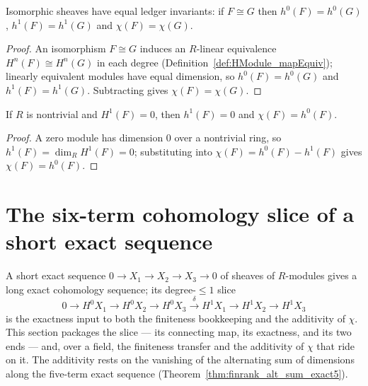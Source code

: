 \begin{theorem}
  \label{thm:chi_congr}
  \leanok
  Isomorphic sheaves have equal ledger invariants: if \(F \cong G\) then
  \(h^0(F) = h^0(G)\), \(h^1(F) = h^1(G)\) and \(\chi(F) = \chi(G)\).
\end{theorem}
\begin{proof}
  \leanok
  An isomorphism \(F \cong G\) induces an \(R\)-linear equivalence
  \(H^n(F) \cong H^n(G)\) in each degree (Definition~\ref{def:HModule_mapEquiv}); linearly
  equivalent modules have equal dimension, so \(h^0(F) = h^0(G)\) and \(h^1(F) = h^1(G)\).
  Subtracting gives \(\chi(F) = \chi(G)\).
\end{proof}

\begin{theorem}
  \label{thm:chi_eq_h0}
  \leanok
  If \(R\) is nontrivial and \(H^1(F) = 0\), then \(h^1(F) = 0\) and
  \(\chi(F) = h^0(F)\).
\end{theorem}
\begin{proof}
  \leanok
  A zero module has dimension \(0\) over a nontrivial ring, so \(h^1(F) = \dim_R H^1(F) = 0\);
  substituting into \(\chi(F) = h^0(F) - h^1(F)\) gives \(\chi(F) = h^0(F)\).
\end{proof}

\section{The six-term cohomology slice of a short exact sequence}

A short exact sequence \(0 \to X_1 \to X_2 \to X_3 \to 0\) of sheaves of \(R\)-modules gives a
long exact cohomology sequence; its degree-\(\le 1\) slice
\[
  0 \to H^0 X_1 \to H^0 X_2 \to H^0 X_3 \xrightarrow{\ \delta\ }
    H^1 X_1 \to H^1 X_2 \to H^1 X_3
\]
is the exactness input to both the finiteness bookkeeping and the additivity of \(\chi\). This
section packages the slice --- its connecting map, its exactness, and its two ends --- and, over a
field, the finiteness transfer and the additivity of \(\chi\) that ride on it. The additivity rests
on the vanishing of the alternating sum of dimensions along the five-term exact sequence
(Theorem~\ref{thm:finrank_alt_sum_exact5}).


